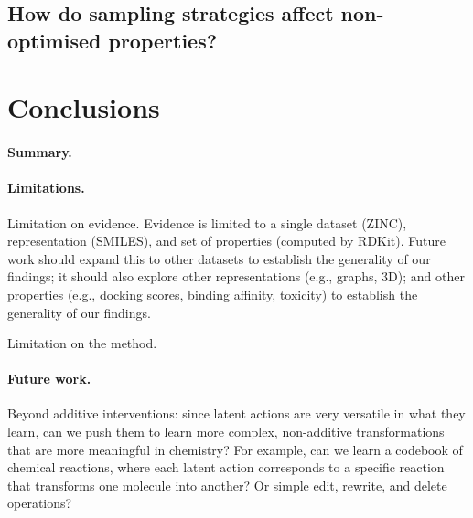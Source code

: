 \documentclass[10pt]{article} %
\begin{document}
\subsection{How do sampling strategies affect non-optimised properties?}





\section{Conclusions}


\paragraph{Summary.}


\paragraph{Limitations.}
Limitation on evidence.
Evidence is limited to a single dataset (ZINC), representation (SMILES), and set of properties (computed by RDKit).
Future work should expand this to other datasets to establish the generality of our findings;
it should also explore other representations (e.g., graphs, 3D);
and other properties (e.g., docking scores, binding affinity, toxicity) to establish the generality of our findings.

Limitation on the method.


\paragraph{Future work.}
Beyond additive interventions: since latent actions are very versatile in what they learn, can we push them to learn more complex, non-additive transformations that are more meaningful in chemistry? For example, can we learn a codebook of chemical reactions, where each latent action corresponds to a specific reaction that transforms one molecule into another? Or simple edit, rewrite, and delete operations?





\end{document}
